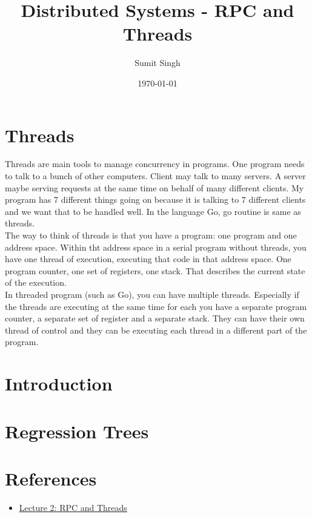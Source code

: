 \documentclass{article}
\title{Distributed Systems - RPC and Threads}
\author{Sumit Singh}
\date{\today}
\begin{document}
\maketitle

\section{Threads}
Threads are main tools to manage concurrency in programs. One program needs to talk to a bunch of other computers. Client may talk to many servers. A server maybe serving requests at the same time on behalf of many different clients. My program has 7 different things going on because it is talking to 7 different clients and we want that to be handled well. In the language Go, go routine is same as threads. \\
The way to think of threads is that you have a program: one program and one address space. Within tht address space in a serial program without threads, you have one thread of execution, executing that code in that address space. One program counter, one set of registers, one stack. That describes the current state of the execution.\\
In threaded program (such as Go), you can have multiple threads. Especially if the threads are executing at the same time for each you have a separate program counter, a separate set of register and a separate stack. They can have their own thread of control and they can be executing each thread in a different part of the program. 
\section{Introduction}

\section{Regression Trees}

\section{References}
\begin{itemize}
    \item \href{https://www.youtube.com/watch?v=gA4YXUJX7t8}{Lecture 2: RPC and Threads}
\end{itemize}
\end{document}
